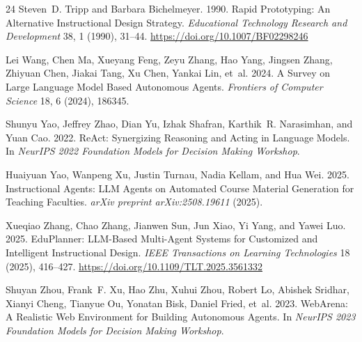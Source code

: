 \documentclass[sigconf,preprint]{acmart}
\begin{document}
\begin{thebibliography}{24}
Steven~D. Tripp and Barbara Bichelmeyer. 1990. Rapid Prototyping: An Alternative Instructional Design Strategy. \emph{Educational Technology Research and Development} 38, 1 (1990), 31--44. \url{https://doi.org/10.1007/BF02298246}

Lei Wang, Chen Ma, Xueyang Feng, Zeyu Zhang, Hao Yang, Jingsen Zhang, Zhiyuan Chen, Jiakai Tang, Xu Chen, Yankai Lin, et~al. 2024. A Survey on Large Language Model Based Autonomous Agents. \emph{Frontiers of Computer Science} 18, 6 (2024), 186345.

Shunyu Yao, Jeffrey Zhao, Dian Yu, Izhak Shafran, Karthik~R. Narasimhan, and Yuan Cao. 2022. ReAct: Synergizing Reasoning and Acting in Language Models. In \emph{NeurIPS 2022 Foundation Models for Decision Making Workshop}.

Huaiyuan Yao, Wanpeng Xu, Justin Turnau, Nadia Kellam, and Hua Wei. 2025. Instructional Agents: LLM Agents on Automated Course Material Generation for Teaching Faculties. \emph{arXiv preprint arXiv:2508.19611} (2025).

Xueqiao Zhang, Chao Zhang, Jianwen Sun, Jun Xiao, Yi Yang, and Yawei Luo. 2025. EduPlanner: LLM-Based Multi-Agent Systems for Customized and Intelligent Instructional Design. \emph{IEEE Transactions on Learning Technologies} 18 (2025), 416--427. \url{https://doi.org/10.1109/TLT.2025.3561332}

Shuyan Zhou, Frank~F. Xu, Hao Zhu, Xuhui Zhou, Robert Lo, Abishek Sridhar, Xianyi Cheng, Tianyue Ou, Yonatan Bisk, Daniel Fried, et~al. 2023. WebArena: A Realistic Web Environment for Building Autonomous Agents. In \emph{NeurIPS 2023 Foundation Models for Decision Making Workshop}.

\end{thebibliography}

\clearpage
\appendix

\end{document}
